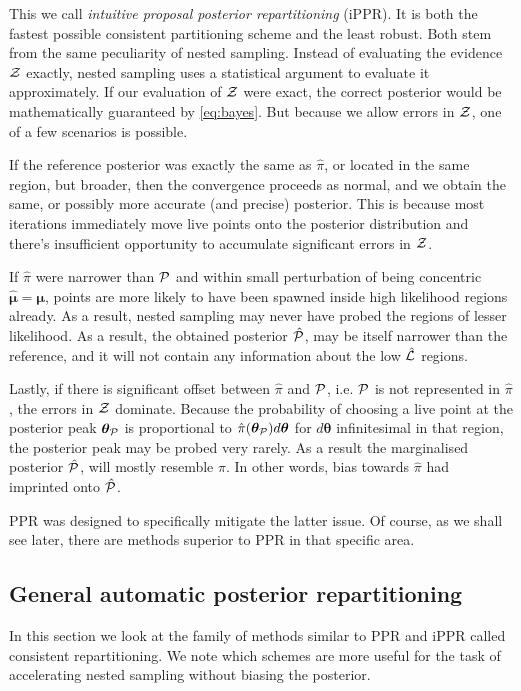\documentclass[usenatbib]{mnras}
\begin{document}
This we call \emph{intuitive proposal posterior repartitioning}
(iPPR). It is both the fastest possible consistent partitioning scheme
and the least robust. Both stem from the same peculiarity of nested
sampling. Instead of evaluating the evidence ${\cal Z}$ exactly,
nested sampling uses a statistical argument to evaluate it
approximately. If our evaluation of ${\cal Z}$ were exact, the correct
posterior would be mathematically guaranteed by \cref{eq:bayes}. But
because we allow errors in ${\cal Z}$, one of a few scenarios is
possible.

If the reference posterior was exactly the same as $\hat{\pi}$, or
located in the same region, but broader, then the convergence proceeds
as normal, and we obtain the same, or possibly more accurate (and
precise) posterior. This is because most iterations immediately move
live points onto the posterior distribution and there's insufficient
opportunity to accumulate significant errors in ${\cal Z}$.

If $\hat{\pi}$ were narrower than ${\cal P}$ and within small
perturbation of being concentric \(\hat{\bm{\mu}} = \bm{\mu}\), points
are more likely to have been spawned inside high likelihood regions
already. As a result, nested sampling may never have probed the
regions of lesser likelihood. As a result, the obtained posterior
$\hat{\cal P}$, may be itself narrower than the reference, and it will
not contain any information about the low $\hat{\cal L}$ regions.

Lastly, if there is significant offset between $\hat{\pi}$ and
${\cal P}$, i.e. ${\cal P}$ is not represented in $\hat{\pi}$, the
errors in ${\cal Z}$ dominate. Because the probability of choosing a
live point at the posterior peak \(\bm{\theta}_{{\cal P}}\) is
proportional to $\hat{\pi}(\bm{\theta}_{{\cal P}})d\bm{\theta}$ for
\(d\bm{\theta}\) infinitesimal in that region, the posterior peak may
be probed very rarely. As a result the marginalised posterior
$\hat{\cal P}$, will mostly resemble $\hat{\pi}$. In other words, bias
towards $\hat{\pi}$ had imprinted onto $\hat{\cal P}$.

PPR was designed to specifically mitigate the latter issue. Of course,
as we shall see later, there are methods superior to PPR in that
specific area.
\subsection{General automatic posterior repartitioning}

In this section we look at the family of methods similar to PPR and
iPPR called consistent repartitioning. We note which schemes are more
useful for the task of accelerating nested sampling without biasing
the posterior.
\end{document}
